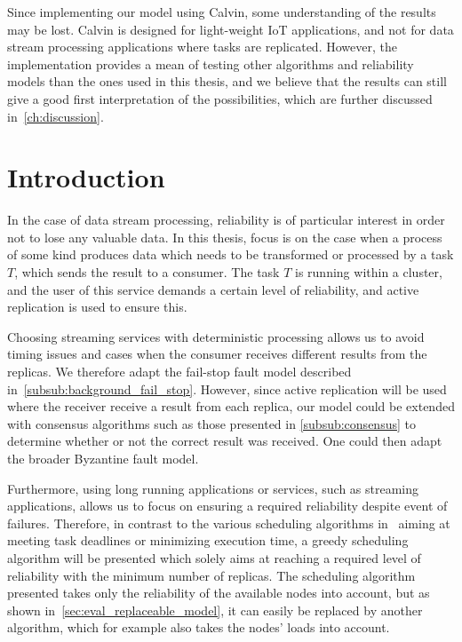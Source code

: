 \documentclass{cslthse-msc}
\begin{document}
Since implementing our model using Calvin, some understanding of the results may be lost. Calvin is designed for light-weight IoT applications, and not for data stream processing applications where tasks are replicated. However, the implementation provides a mean of testing other algorithms and reliability models than the ones used in this thesis, and we believe that the results can still give a good first interpretation of the possibilities, which are further discussed in~\cref{ch:discussion}.

\section{Introduction} \label{sec:design_intro}
In the case of data stream processing, reliability is of particular interest in order not to lose any valuable data. In this thesis, focus is on the case when a process of some kind produces data which needs to be transformed or processed by a task $T$, which sends the result to a consumer. The task $T$ is running within a cluster, and the user of this service demands a certain level of reliability, and active replication is used to ensure this.	

Choosing streaming services with deterministic processing allows us to avoid timing issues and cases when the consumer receives different results from the replicas. We therefore adapt the fail-stop fault model described in~\cref{subsub:background_fail_stop}. However, since active replication will be used where the receiver receive a result from each replica, our model could be extended with consensus algorithms such as those presented in \cref{subsub:consensus} to determine whether or not the correct result was received. One could then adapt the broader Byzantine fault model. 

Furthermore, using long running applications or services, such as streaming applications, allows us to focus on ensuring a required reliability despite event of failures. Therefore, in contrast to the various scheduling algorithms in~\cite{algoOptTimeMaxRel, optTaskAllocationForMaxRel, taskAllocation, taskAllocationSwarm, algoMaxRelEndToEndConstraint, algoMinExTime, schedReplicas} aiming at meeting task deadlines or minimizing execution time, a greedy scheduling algorithm will be presented which solely aims at reaching a required level of reliability with the minimum number of replicas. The scheduling algorithm presented takes only the reliability of the available nodes into account, but as shown in~\cref{sec:eval_replaceable_model}, it can easily be replaced by another algorithm, which for example also takes the nodes' loads into account.
\end{document}
